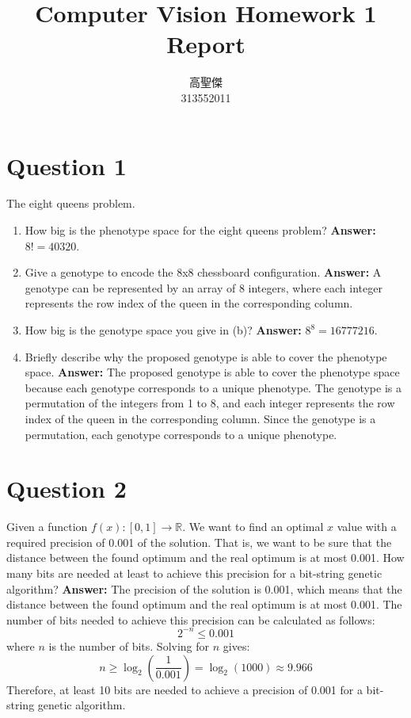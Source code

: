 \documentclass[12pt,letterpaper]{article}
\newcommand{\xAns}{\vskip 2mm\textbf{Answer:} }
\begin{document}
\begin{CJK}{UTF8}{bkai}
    \title{Computer Vision Homework 1 Report}

    \author{
        高聖傑\\
        313552011\\
    }

    \maketitle
\end{CJK}

\section{Question 1}
The eight queens problem.
\begin{enumerate}[label=(\alph*)]
    \item How big is the phenotype space for the eight queens problem? \xAns $8! = 40320$.
    \item Give a genotype to encode the 8x8 chessboard configuration. \xAns A genotype can be represented by an array of 8 integers, where each integer represents the row index of the queen in the corresponding column.
    \item How big is the genotype space you give in (b)? \xAns $8^8 = 16777216$.
    \item Briefly describe why the proposed genotype is able to cover the phenotype space. \xAns The proposed genotype is able to cover the phenotype space because each genotype corresponds to a unique phenotype. The genotype is a permutation of the integers from 1 to 8, and each integer represents the row index of the queen in the corresponding column. Since the genotype is a permutation, each genotype corresponds to a unique phenotype.
\end{enumerate}
\section{Question 2}
Given a function $f(x) : [0,1] \rightarrow \mathbb{R}$. We want to find an optimal $x$
value with a required precision of 0.001 of the solution. That is, we
want to be sure that the distance between the found optimum and the
real optimum is at most 0.001. How many bits are needed at least to
achieve this precision for a bit-string genetic algorithm?
\xAns The precision of the solution is 0.001, which means that the distance between the found optimum and the real optimum is at most 0.001. The number of bits needed to achieve this precision can be calculated as follows:
\begin{equation}
    2^{-n} \leq 0.001
\end{equation}
where $n$ is the number of bits. Solving for $n$ gives:
\begin{equation}
    n \geq \log_2\left(\frac{1}{0.001}\right) = \log_2(1000) \approx 9.966
\end{equation}
Therefore, at least 10 bits are needed to achieve a precision of 0.001 for a bit-string genetic algorithm.
\end{document}
